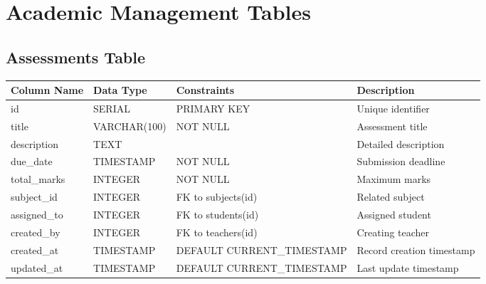 \documentclass[11pt,a4paper]{article}
\begin{document}
\section{Academic Management Tables}

\subsection{Assessments Table}
\begin{longtable}{|p{3cm}|p{3cm}|p{2cm}|p{6cm}|}
\hline
\textbf{Column Name} & \textbf{Data Type} & \textbf{Constraints} & \textbf{Description} \\
\hline
\endhead
id & SERIAL & PRIMARY KEY & Unique identifier \\
\hline
title & VARCHAR(100) & NOT NULL & Assessment title \\
\hline
description & TEXT & & Detailed description \\
\hline
due\_date & TIMESTAMP & NOT NULL & Submission deadline \\
\hline
total\_marks & INTEGER & NOT NULL & Maximum marks \\
\hline
subject\_id & INTEGER & FK to subjects(id) & Related subject \\
\hline
assigned\_to & INTEGER & FK to students(id) & Assigned student \\
\hline
created\_by & INTEGER & FK to teachers(id) & Creating teacher \\
\hline
created\_at & TIMESTAMP & DEFAULT CURRENT\_TIMESTAMP & Record creation timestamp \\
\hline
updated\_at & TIMESTAMP & DEFAULT CURRENT\_TIMESTAMP & Last update timestamp \\
\hline
\end{longtable}
\end{document}
